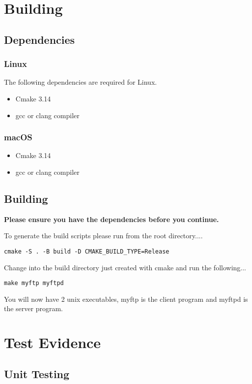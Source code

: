 \documentclass{article}
\begin{document}
\section{Building}
\subsection{Dependencies}
\subsubsection*{Linux}
The following dependencies are required for Linux.
\begin{itemize}
    \item Cmake 3.14
    \item gcc or clang compiler
\end{itemize}
\subsubsection*{macOS}
\begin{itemize}
    \item Cmake 3.14
    \item gcc or clang compiler
\end{itemize}
\subsection{Building}
\begin{center}
\textbf{Please ensure you have the dependencies before you continue.}
\end{center}
To generate the build scripts please run from the root directory....
\begin{lstlisting}
cmake -S . -B build -D CMAKE_BUILD_TYPE=Release    
\end{lstlisting}
Change into the build directory just created with cmake and run the following...
\begin{lstlisting}
make myftp myftpd    
\end{lstlisting}
You will now have 2 unix executables, myftp is the client program and myftpd is the server program.

\section{Test Evidence}
\subsection{Unit Testing}
\end{document}
